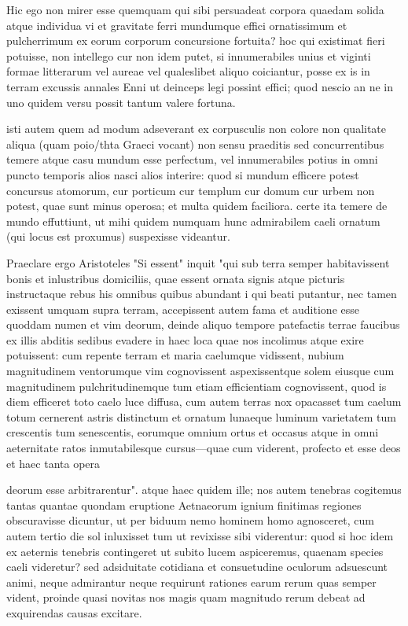  Hic ego non mirer esse quemquam qui sibi persuadeat corpora quaedam solida atque individua vi et gravitate ferri mundumque effici ornatissimum et pulcherrimum ex eorum corporum concursione fortuita? hoc qui existimat fieri potuisse, non intellego cur non idem putet, si innumerabiles unius et viginti formae litterarum vel aureae vel qualeslibet aliquo coiciantur, posse ex is in terram excussis annales Enni ut deinceps legi possint effici; quod nescio an ne in uno quidem versu possit tantum valere fortuna.

 isti autem quem ad modum adseverant ex corpusculis non colore non qualitate aliqua (quam poio/thta Graeci vocant) non sensu praeditis sed concurrentibus temere atque casu mundum esse perfectum, vel innumerabiles potius in omni puncto temporis alios nasci alios interire: quod si mundum efficere potest concursus atomorum, cur porticum cur templum cur domum cur urbem non potest, quae sunt minus operosa; et multa quidem faciliora. certe ita temere de mundo effuttiunt, ut mihi quidem numquam hunc admirabilem caeli ornatum (qui locus est proxumus) suspexisse videantur.

 Praeclare ergo Aristoteles "Si essent" inquit "qui sub terra semper habitavissent bonis et inlustribus domiciliis, quae essent ornata signis atque picturis instructaque rebus his omnibus quibus abundant i qui beati putantur, nec tamen exissent umquam supra terram, accepissent autem fama et auditione esse quoddam numen et vim deorum, deinde aliquo tempore patefactis terrae faucibus ex illis abditis sedibus evadere in haec loca quae nos incolimus atque exire potuissent: cum repente terram et maria caelumque vidissent, nubium magnitudinem ventorumque vim cognovissent aspexissentque solem eiusque cum magnitudinem pulchritudinemque tum etiam efficientiam cognovissent, quod is diem efficeret toto caelo luce diffusa, cum autem terras nox opacasset tum caelum totum cernerent astris distinctum et ornatum lunaeque luminum varietatem tum crescentis tum senescentis, eorumque omnium ortus et occasus atque in omni aeternitate ratos inmutabilesque cursus—quae cum viderent, profecto et esse deos et haec tanta opera

 deorum esse arbitrarentur". atque haec quidem ille; nos autem tenebras cogitemus tantas quantae quondam eruptione Aetnaeorum ignium finitimas regiones obscuravisse dicuntur, ut per biduum nemo hominem homo agnosceret, cum autem tertio die sol inluxisset tum ut revixisse sibi viderentur: quod si hoc idem ex aeternis tenebris contingeret ut subito lucem aspiceremus, quaenam species caeli videretur? sed adsiduitate cotidiana et consuetudine oculorum adsuescunt animi, neque admirantur neque requirunt rationes earum rerum quas semper vident, proinde quasi novitas nos magis quam magnitudo rerum debeat ad exquirendas causas excitare.


